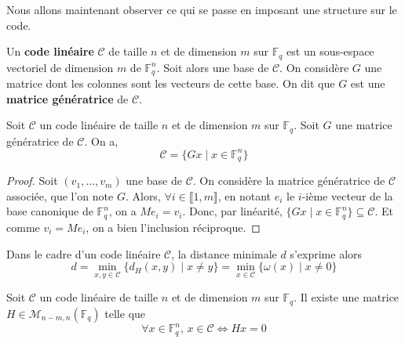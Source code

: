 	Nous allons maintenant observer ce qui se passe en imposant une structure sur le code.
	
	\begin{definition}
		Un \textbf{code linéaire} $\mathcal{C}$ de taille $n$ et de dimension $m$ sur $\mathbb{F}_q$ est un sous-espace vectoriel de dimension $m$ de $\mathbb{F}_q^n$.
		\newpar
		Soit alors une base de $\mathcal{C}$. On considère $G$ une matrice dont les colonnes sont les vecteurs de cette base. On dit que $G$ est une \textbf{matrice génératrice} de $\mathcal{C}$.
	\end{definition}
	
	\begin{proposition}
		Soit $\mathcal{C}$ un code linéaire de taille $n$ et de dimension $m$ sur $\mathbb{F}_q$. Soit $G$ une matrice génératrice de $\mathcal{C}$. On a,
		\[ \mathcal{C} = \{ Gx \mid x \in \mathbb{F}_q^n \} \]
	\end{proposition}
	
	\begin{proof}
		Soit $(v_1, \dots, v_m)$ une base de $\mathcal{C}$. On considère la matrice génératrice de $\mathcal{C}$ associée, que l'on note $G$.
		\newpar
		Alors, $\forall i \in \llbracket 1, m \rrbracket$, en notant $e_i$ le $i$-ième vecteur de la base canonique de $\mathbb{F}_q^n$, on a $Me_i = v_i$. Donc, par linéarité, $\{ Gx \mid x \in \mathbb{F}_q^n \} \subseteq \mathcal{C}$.
		Et comme $v_i = Me_i$, on a bien l'inclusion réciproque.
	\end{proof}
	
	\begin{remark}
		Dans le cadre d'un code linéaire $\mathcal{C}$, la distance minimale $d$ s'exprime alors
		\[ d = \min_{x,y \in \mathcal{C}} \{ d_H(x,y) \mid x \neq y \} = \min_{x \in \mathcal{C}} \{ \omega(x) \mid x \neq 0 \} \]
	\end{remark}
	
	\begin{proposition}
		Soit $\mathcal{C}$ un code linéaire de taille $n$ et de dimension $m$ sur $\mathbb{F}_q$. Il existe une matrice $H \in \mathcal{M}_{n-m,n}(\mathbb{F}_q)$ telle que
		\[ \forall x \in \mathbb{F}_q^n, \, x \in \mathcal{C} \iff Hx = 0 \]
	\end{proposition}
	
